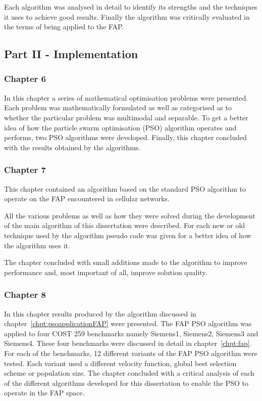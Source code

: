 Each algorithm was analysed in detail to identify its strengths and the techniques it uses to achieve good results. Finally the algorithm was critically evaluated in the terms of being applied to the FAP.
\subsection{Part II - Implementation}
\subsubsection{Chapter 6}
In this chapter a series of mathematical optimisation problems were presented. Each problem was mathematically formulated as well as categorised as to whether the particular problem was multimodal and separable.
To get a better idea of how the particle swarm optimisation (PSO) algorithm operates and performs, two PSO algorithms were developed. Finally, this chapter concluded with the results obtained by the algorithms.
\subsubsection{Chapter 7}
This chapter contained an algorithm based on the standard PSO algorithm to operate on the FAP encountered in cellular networks.

All the various problems as well as how they were solved during the development of the main algorithm of this dissertation were described. For each new or old technique used by the algorithm pseudo code was given for a better idea of how the algorithm uses it.

The chapter concluded with small additions made to the algorithm to improve performance and, most important of all, improve solution quality.
\subsubsection{Chapter 8}
In this chapter results produced by the algorithm discussed in chapter~\ref{chpt:psoapplicationFAP} were presented. The FAP PSO algorithm was applied to four COST 259 benchmarks namely Siemens1, Siemens2, Siemens3 and Siemens4. These four benchmarks were discussed in detail in chapter~\ref{chpt:fap}. For each of the benchmarks, 12 different variants of the FAP PSO algorithm were tested. Each variant used a different velocity function, global best selection scheme or population size. The chapter concluded with a critical analysis of each of the different algorithms developed for this dissertation to enable the PSO to operate in the FAP space.
